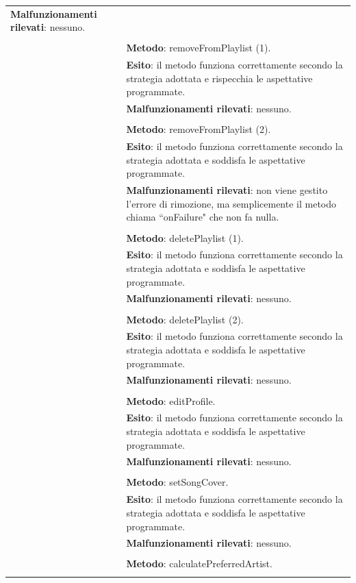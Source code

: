 \begin{footnotesize}
\begin{longtable}{|p{5.7cm}|p{10.3cm}|}
  \textbf{Malfunzionamenti rilevati}: nessuno.\\&
  \\&
  \textbf{Metodo}: removeFromPlaylist (1).\\&
  \textbf{Esito}: il metodo funziona correttamente secondo la strategia
  adottata e rispecchia le aspettative programmate.\\&
  \textbf{Malfunzionamenti rilevati}: nessuno.\\&
  \\&
  \textbf{Metodo}: removeFromPlaylist (2).\\&
  \textbf{Esito}: il metodo funziona correttamente secondo la strategia
  adottata e soddisfa le aspettative programmate.\\&
  \textbf{Malfunzionamenti rilevati}: non viene gestito l'errore di rimozione,
  ma semplicemente il metodo chiama ``onFailure" che non fa nulla.\\&
  \\&
  \textbf{Metodo}: deletePlaylist (1).\\&
  \textbf{Esito}: il metodo funziona correttamente secondo la strategia
  adottata e soddisfa le aspettative programmate.\\&
  \textbf{Malfunzionamenti rilevati}: nessuno.\\&
  \\&
  \textbf{Metodo}: deletePlaylist (2).\\&
  \textbf{Esito}: il metodo funziona correttamente secondo la strategia
  adottata e soddisfa le aspettative programmate.\\&
  \textbf{Malfunzionamenti rilevati}: nessuno.\\&
  \\&
  \textbf{Metodo}: editProfile.\\&
  \textbf{Esito}: il metodo funziona correttamente secondo la strategia
  adottata e soddisfa le aspettative programmate.\\&
  \textbf{Malfunzionamenti rilevati}: nessuno.\\&
  \\&
  \textbf{Metodo}: setSongCover.\\&
  \textbf{Esito}: il metodo funziona correttamente secondo la strategia
  adottata e soddisfa le aspettative programmate.\\&
  \textbf{Malfunzionamenti rilevati}: nessuno.\\&
  \\&
  \textbf{Metodo}: calculatePreferredArtist.\\&

\end{longtable}
\end{footnotesize}
